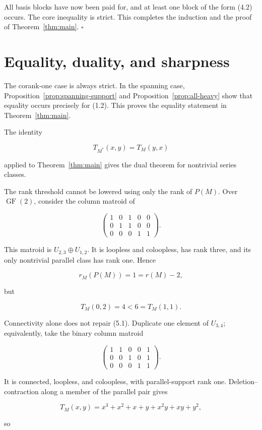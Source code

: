 \documentclass[11pt]{article}
\begin{document}
All basis blocks have now been paid for, and at least one block of the form
(4.2) occurs. The core inequality is strict. This completes the induction and
the proof of Theorem~\ref{thm:main}.
\hfill$\square$


\section{Equality, duality, and sharpness}


The corank-one case is always strict. In the spanning case, Proposition~\ref{prop:spanning-support}
and Proposition~\ref{prop:all-heavy} show that equality occurs precisely for (1.2). This proves
the equality statement in Theorem~\ref{thm:main}.

The identity

\[
T_{M^*}(x,y)=T_M(y,x)
\]

applied to Theorem~\ref{thm:main} gives the dual theorem for nontrivial series classes.

The rank threshold cannot be lowered using only the rank of \(P(M)\). Over
\(\operatorname{GF}(2)\), consider the column matroid of

\[
\begin{pmatrix}
1&0&1&0&0\\
0&1&1&0&0\\
0&0&0&1&1
\end{pmatrix}.
\]

This matroid is \(U_{2,3}\oplus U_{1,2}\). It is loopless and coloopless,
has rank three, and its only nontrivial parallel class has rank one. Hence

\[
r_M(P(M))=1=r(M)-2,
\]

but

\[
T_M(0,2)=4<6=T_M(1,1).                         \tag{5.1}
\]

Connectivity alone does not repair (5.1). Duplicate one element of
\(U_{3,4}\); equivalently, take the binary column matroid

\[
\begin{pmatrix}
1&1&0&0&1\\
0&0&1&0&1\\
0&0&0&1&1
\end{pmatrix}.
\]

It is connected, loopless, and coloopless, with parallel-support rank one.
Deletion--contraction along a member of the parallel pair gives

\[
T_M(x,y)=x^3+x^2+x+y+x^2y+xy+y^2,
\]

so
\end{document}
